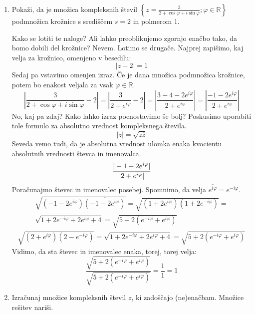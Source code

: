 \documentclass[12pt,a4paper,slovene]{article}
\newcommand{\RR}{\mathbb{R}}
\begin{document}
\begin{enumerate}[(1)]
    \item Pokaži, da je množica kompleksnih števil $\left\{ z = \frac{3}{2 + \cos \varphi + i \sin \varphi}; \varphi \in \RR \right\}$ podmnožica krožnice s središčem $s = 2$ in polmerom 1.
    
    Kako se lotiti te naloge? Ali lahko preoblikujemo zgornjo enačbo tako, da bomo dobili del krožnice? Nevem. Lotimo se drugače. Najprej zapišimo, kaj velja za krožnico, omenjeno v besedilu:
    \[
    |z - 2| = 1
    \]
    Sedaj pa vstavimo omenjen izraz. Če je dana množica podmnožica krožnice, potem bo enakost veljala za vsak $\varphi \in \RR$.
    \[
    \left|\frac{3}{2 + \cos \varphi + i \sin \varphi} - 2\right| = \left|\frac{3}{2 + e^{i \varphi}} - 2\right| = \left|\frac{3 - 4 - 2 e ^{i\varphi}}{2 + e^{i \varphi}} \right| = \left|\frac{-1 - 2 e ^{i\varphi}}{2 + e^{i \varphi}} \right|
    \]
    No, kaj pa zdaj? Kako lahko izraz poenostavimo še bolj? Poskusimo uporabiti tole formulo za absolutno vrednost kompleksnega števila.
    \[
    |z| = \sqrt{z \overline{z}}
    \]
    Seveda vemo tudi, da je absolutna vrednost ulomka enaka kvocientu absolutnih vrednosti števca in imenovalca.
    \[
    \frac{|-1 - 2e^{i\varphi}|}{|2 + e^{i\varphi}|} \\
    \]
    Poračunajmo števec in imenovalec posebej. Spomnimo, da velja $\overline{e^{i\varphi}} = e^{-i\varphi}$.
    \begin{multline*}
    \sqrt{(-1 - 2e^{i\varphi}) \overline{(-1 - 2e^{i\varphi})}} =
    \sqrt{(1 + 2e^{i\varphi}) (1 + 2e^{-i\varphi})} = \\
    \sqrt{1 + 2e^{-i\varphi} + 2e^{i\varphi} + 4} = \sqrt{5 + 2(e^{-i\varphi} + e^{i\varphi})}
    \end{multline*}
    \begin{multline*}
    \sqrt{(2 + e^{i\varphi}) (2 - e^{-i\varphi})} =
    \sqrt{1 + 2e^{-i\varphi} + 2e^{i\varphi} + 4} = \sqrt{5 + 2(e^{-i\varphi} + e^{i\varphi})}
    \end{multline*}
    Vidimo, da sta števec in imenovalec enaka, torej, torej velja:
    \[
    \frac{\sqrt{5 + 2(e^{-i\varphi} + e^{i\varphi})}}{\sqrt{5 + 2(e^{-i\varphi} + e^{i\varphi})}} = \frac{1}{1} = 1
    \]
    
    
    
    \item Izračunaj množice kompleksnih števil $z$, ki zadoščajo (ne)enačbam. Množice rešitev nariši.
    

\end{enumerate}
\end{document}
